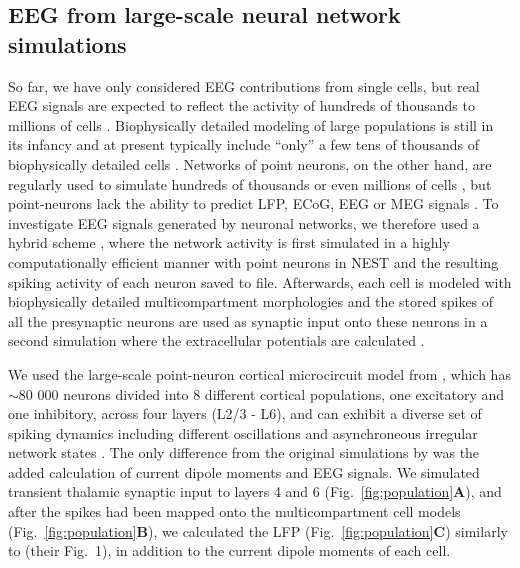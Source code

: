 \documentclass[preprint,10pt,authoryear]{elsarticle}
\begin{document}
\subsection{EEG from large-scale neural network simulations}
\label{subsec:populations}
So far, we have only considered EEG contributions from single cells, but real EEG signals are expected to reflect the activity of hundreds of thousands to millions of cells \citep{NUNEZ2006, COHEN2017}. 
Biophysically detailed modeling of large populations is still in its infancy \citep{EINEVOLL2019} and at present typically include ``only'' a few tens of thousands of biophysically detailed cells \citep{MARKRAM2015, BILLEH2019}. Networks of point neurons, on the other hand, are regularly used to simulate hundreds of thousands \citep{BILLEH2019} or even millions of cells \citep{SENK2018, SCHMIDT2018}, but point-neurons lack the ability to predict LFP, ECoG, EEG or MEG signals \citep{EINEVOLL2013REVIEW}.  
To investigate EEG signals generated by neuronal networks, we therefore used a hybrid scheme \citep{HAGEN2016, SENK2018, Skaar2020}, where the network activity is first simulated in a highly computationally efficient manner with point neurons in NEST \citep{NEST} and the resulting spiking activity of each neuron saved to file. Afterwards, each cell is modeled with biophysically detailed multicompartment morphologies and the stored spikes of all the presynaptic neurons are used as synaptic input onto these neurons in a second simulation  where the extracellular potentials are calculated \citep{HAGEN2016, SENK2018}.

We used the large-scale point-neuron cortical microcircuit model from \cite{POTJANS2014, HAGEN2016}, which has $\sim$80 000 neurons divided into 8 different cortical populations, one excitatory and one inhibitory, across four layers (L2/3 - L6), and can exhibit a diverse set of spiking dynamics including different oscillations and asynchroneous irregular network states \citep{HAGEN2016, BRUNEL2000}. 
The only difference from the original simulations by \cite{HAGEN2016} was the added calculation of current dipole moments and EEG signals.
We simulated transient thalamic synaptic input to layers 4 and 6 (Fig.~\ref{fig:population}\textbf{A}), and after the spikes had been mapped onto the multicompartment cell models (Fig.~\ref{fig:population}\textbf{B}), we calculated the LFP (Fig.~\ref{fig:population}\textbf{C}) similarly to \cite{HAGEN2016} (their Fig.~1), in addition to the current dipole moments of each cell.
\end{document}
